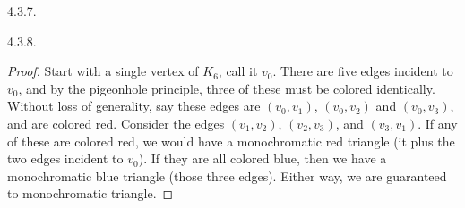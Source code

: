 \begin {itemize}
\begin{ans}{4.3.7.}
\end{ans}
\begin{ans}{4.3.8.}
		\begin{proof}
		Start with a single vertex of $K_6$, call it $v_0$.  There are five edges incident to $v_0$, and by the pigeonhole principle, three of these must be colored identically.  Without loss of generality, say these edges are $(v_0, v_1)$, $(v_0, v_2)$ and $(v_0,v_3)$, and are colored red.  Consider the edges $(v_1,v_2)$, $(v_2,v_3)$, and $(v_3, v_1)$.  If any of these are colored red, we would have a monochromatic red triangle (it plus the two edges incident to $v_0$).  If they are all colored blue, then we have a monochromatic blue triangle (those three edges).  Either way, we are guaranteed to monochromatic triangle.

		\end{proof}
	
\end{ans}
\protect \end {itemize}
